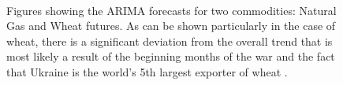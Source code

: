 \documentclass[11pt,regno]{amsart}
\theoremstyle{plain}
\numberwithin{equation}{section}
\begin{document}
\begin{figure}
\centering
\centerline{ \mbox{
}}
\caption{Figures showing the ARIMA forecasts for two commodities: Natural Gas and Wheat futures. As can be shown particularly in the case of wheat, there is a significant deviation from the overall trend that is most likely a result of the beginning months of the war and the fact that Ukraine is the world's 5th largest exporter of wheat \cite{Wheat_Ukraine}.  }
\end{figure}
\end{document}
